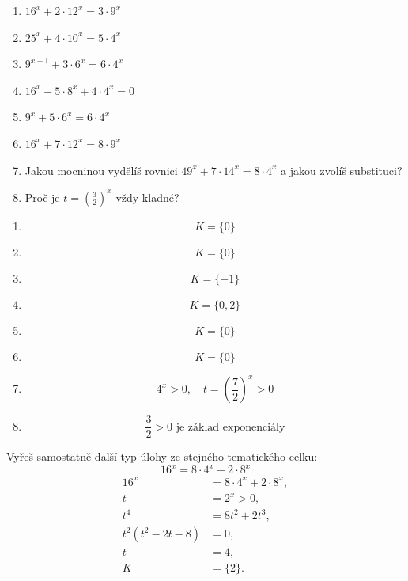 \documentclass[11pt,a4paper]{article}
\begin{document}
\begin{zadaniReseniBox}[title={Samostatná práce 1}]
\begin{enumerate}[label=\alph*)]
\item $16^x+2\cdot12^x=3\cdot9^x$
\item $25^x+4\cdot10^x=5\cdot4^x$
\item $9^{x+1}+3\cdot6^x=6\cdot4^x$
\item $16^x-5\cdot8^x+4\cdot4^x=0$
\item $9^x+5\cdot6^x=6\cdot4^x$
\item $16^x+7\cdot12^x=8\cdot9^x$
\item Jakou mocninou vydělíš rovnici $49^x+7\cdot14^x=8\cdot4^x$ a jakou zvolíš substituci?
\item Proč je $t=(\frac{3}{2})^x$ vždy kladné?
\end{enumerate}
\tcblower
\begin{enumerate}[label=\alph*)]
\item \[K=\{0\}\]
\item \[K=\{0\}\]
\item \[K=\{-1\}\]
\item \[K=\{0,2\}\]
\item \[
K=\{0\}
\]
\item \[K=\{0\}\]
\item \[4^x>0,\quad t=\left(\frac{7}{2}\right)^x>0\]
\item \[
\frac{3}{2}>0\text{ je základ exponenciály}
\]
\end{enumerate}
\end{zadaniReseniBox}
\begin{zadaniReseniBox}[title={Samostatná práce 2}]
Vyřeš samostatně další typ úlohy ze stejného tematického celku:
\[
\displaystyle16^x=8\cdot4^x+2\cdot8^x
\]
\tcblower
\[\begin{aligned}16^x&=8\cdot4^x+2\cdot8^x,\\t&=2^x>0,\\t^4&=8t^2+2t^3,\\t^2(t^2-2t-8)&=0,\\t&=4,\\K&=\{2\}.\end{aligned}\]
\end{zadaniReseniBox}
\end{document}
